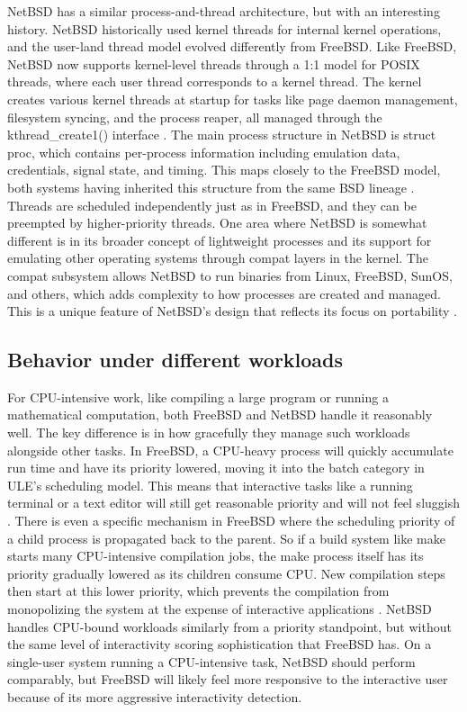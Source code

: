NetBSD has a similar process-and-thread architecture, but with an interesting history. NetBSD historically used kernel threads for internal kernel operations, and the user-land thread model evolved differently from FreeBSD. Like FreeBSD, NetBSD now supports kernel-level threads through a 1:1 model for POSIX threads, where each user thread corresponds to a kernel thread. The kernel creates various kernel threads at startup for tasks like page daemon management, filesystem syncing, and the process reaper, all managed through the kthread\_create1() interface \parencite{netBSDnd}.
The main process structure in NetBSD is struct proc, which contains per-process information including emulation data, credentials, signal state, and timing. This maps closely to the FreeBSD model, both systems having inherited this structure from the same BSD lineage \parencite{netBSDnd}. Threads are scheduled independently just as in FreeBSD, and they can be preempted by higher-priority threads.
One area where NetBSD is somewhat different is in its broader concept of lightweight processes and its support for emulating other operating systems through compat layers in the kernel. The compat subsystem allows NetBSD to run binaries from Linux, FreeBSD, SunOS, and others, which adds complexity to how processes are created and managed. This is a unique feature of NetBSD's design that reflects its focus on portability \parencite{feyrer2002}.

\subsection{Behavior under different workloads}
For CPU-intensive work, like compiling a large program or running a mathematical computation, both FreeBSD and NetBSD handle it reasonably well. The key difference is in how gracefully they manage such workloads alongside other tasks. In FreeBSD, a CPU-heavy process will quickly accumulate run time and have its priority lowered, moving it into the batch category in ULE's scheduling model. This means that interactive tasks like a running terminal or a text editor will still get reasonable priority and will not feel sluggish \parencite{watson2015}.
There is even a specific mechanism in FreeBSD where the scheduling priority of a child process is propagated back to the parent. So if a build system like make starts many CPU-intensive compilation jobs, the make process itself has its priority gradually lowered as its children consume CPU. New compilation steps then start at this lower priority, which prevents the compilation from monopolizing the system at the expense of interactive applications \parencite{watson2015}.
NetBSD handles CPU-bound workloads similarly from a priority standpoint, but without the same level of interactivity scoring sophistication that FreeBSD has. On a single-user system running a CPU-intensive task, NetBSD should perform comparably, but FreeBSD will likely feel more responsive to the interactive user because of its more aggressive interactivity detection.

